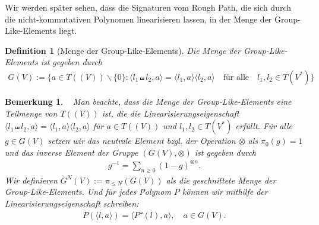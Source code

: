 \documentclass[12pt,titlepage,headsepline]{article}
\newtheorem{definition}{Definition}[section]
\newtheorem*{bemerkung*}{Bemerkung}
\begin{document}
      \hfill\break
      Wir werden später sehen, dass die Signaturen vom Rough Path, die sich durch die nicht-kommutativen Polynomen linearisieren lassen, in der Menge der Group-Like-Elements liegt.
      \begin{definition}[Menge der Group-Like-Elements]
        Die Menge der \textit{Group-Like-Elements} ist gegeben durch
        \begin{align*}
          G(V):=\{a \in T((V)) \backslash \{0\} : \langle l_1 \shuffle l_2,a \rangle = \langle l_1,a \rangle \langle l_2,a\rangle \quad \text{für alle} \quad l_1, l_2 \in T(V^*)\}
        \end{align*}
      \end{definition}

      \begin{bemerkung*}
        \
        \textup{
        Man beachte, dass die Menge der Group-Like-Elements eine Teilmenge von $T((V))$ ist, die die Linearisierungseigenschaft $\langle l_1 \shuffle l_2,a \rangle = \langle l_1,a \rangle \langle l_2,a\rangle$ für $a \in T((V))$ und $l_1, l_2 \in T(V^*)$ erfüllt. Für alle $g \in G(V)$ setzen wir das neutrale Element bzgl. der Operation $\otimes$ als $\pi_0(g) = 1$ und das inverse Element der Gruppe $(G(V),\otimes)$ ist gegeben durch
        \begin{align*}
          g^{-1}=\sum_{n\geq 0}(1-g)^{\otimes n}.
        \end{align*}
        Wir definieren $G^N(V):=\pi_{\leq N}(G(V))$ als die geschnittete Menge der Group-Like-Elements. Und für jedes Polynom $P$ können wir mithilfe der Linearisierungseigenschaft schreiben:
        \begin{align*}
          P(\langle l, a \rangle) = \langle P^{\shuffle}(l),a \rangle, \quad a \in G(V).
        \end{align*}
        }
      \end{bemerkung*}
      \newpage
\end{document}
